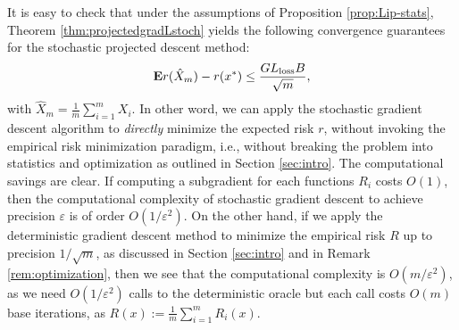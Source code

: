 It is easy to check that under the assumptions of Proposition \ref{prop:Lip-stats}, Theorem \ref{thm:projectedgradLstoch} yields the following convergence guarantees for the stochastic projected descent method:
$$
	\mathbf{E} r(\hat X_m) - r(x^*) \leq \frac{GL_\textrm{loss}B}{\sqrt{m}},
$$
with $\hat X_m = \frac{1}{m}\sum_{i=1}^m X_i$. In other word, we can apply the stochastic gradient descent algorithm to \emph{directly} minimize the expected risk $r$, without invoking the empirical risk minimization paradigm, i.e., without breaking the problem into statistics and optimization as outlined in Section \ref{sec:intro}. The computational savings are clear. If computing a subgradient for each functions $R_i$ costs $O(1)$, then the computational complexity of stochastic gradient descent to achieve precision $\varepsilon$ is of order $O(1/\varepsilon^2)$. On the other hand, if we apply the deterministic gradient descent method to minimize the empirical risk $R$ up to precision $1/\sqrt{m}$, as discussed in Section \ref{sec:intro} and in Remark \ref{rem:optimization}, then we see that the computational complexity is $O(m/\varepsilon^2)$, as we need $O(1/\varepsilon^2)$ calls to the deterministic oracle but each call costs $O(m)$ base iterations, as $R(x) := \frac{1}{m} \sum_{i=1}^m R_i(x)$.




